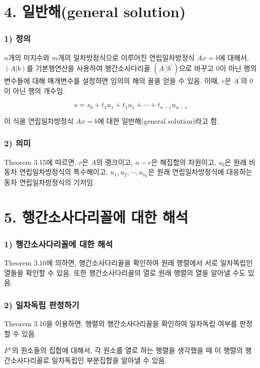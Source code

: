 \newpage


\section*{4. 일반해(general solution)}
\subsubsection*{1) 정의\\}
\begin{DEF}
$n$개의 미지수와 $m$개의 일차방정식으로 이루어진 연립일차방정식 $Ax=b$에 대해서, $(A|b)$를 기본행연산을 사용하여 행간소사다리꼴 $(A^{\prime}|b^{\prime})$으로 바꾸고 0이 아닌 행의 변수들에 대해 매개변수를 설정하면 임의의 해의 꼴을 얻을 수 있음. 이때, $r$은 $A^{\prime}$의 0이 아닌 행의 개수임.

\[
s=s_0+t_1u_1+t_1u_1+ \cdots + t_{n-r}u_{n-r}
\]

이 식을 연립일차방정식 $Ax=b$에 대한 일반해(general solution)라고 함.
\end{DEF}

\subsubsection*{2) 의미}
Theorem 3.15에 따르면, $r$은 $A$의 랭크이고, $n-r$은 해집합의 차원이고, $s_0$은 원래 비동차 연립일차방정식의 특수해이고, $u_1,u_2, \cdots ,u_{n_r}$은 원래 연립일차방정식에 대응하는 동차 연립일차방정식의 기저임.\\


\section*{5. 행간소사다리꼴에 대한 해석}
\subsubsection*{1) 행간소사다리꼴에 대한 해석}
Theorem 3.16에 의하면, 행간소사다리꼴을 확인하여 원래 행렬에서 서로 일차독립인 열들을 확인할 수 있음. 또한 행간소사다리꼴의 열로 원래 행렬의 열을 알아낼 수도 있음.

\subsubsection*{2) 일차독립 판정하기}
Theorem 3.16을 이용하면, 행렬의 행간소사다리꼴을 확인하여 일차독립 여부를 판정할 수 있음.

$F^n$의 원소들의 집합에 대해서, 각 원소를 열로 하는 행렬을 생각했을 때 이 행렬의 행간소사다리꼴로 일차독립인 부분집합을 알아낼 수 있음.

